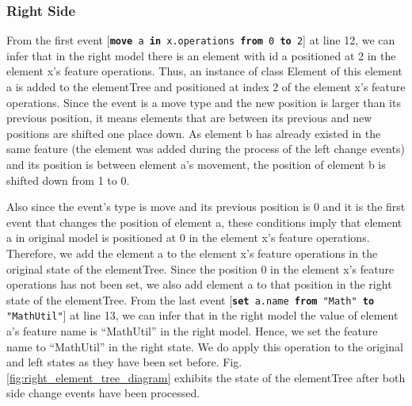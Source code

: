 \documentclass{jot}
\begin{document}
\subsubsection{Right Side}\label{sec:right_side}  From the first event [\texttt{\small \textbf{move} a \textbf{in} x.operations \textbf{from} 0 \textbf{to} 2}] at line 12, we can infer that in the right model there is an element with id \textsf{a} positioned at 2 in the element \textsf{x}'s feature \textsf{operations}. Thus, an instance of class \textsf{Element} of this element \textsf{a} is added to the \textsf{elementTree} and positioned at index 2 of the element \textsf{x}'s feature \textsf{operations}. Since the event is a \textsf{move} type and the new position is larger than its previous position, it means elements that are between its previous and new positions are shifted one place down. As element \textsf{b} has already existed in the same feature (the element was added during the process of the left change events) and its position is between element \textsf{a}'s movement, the position of element \textsf{b} is shifted down from 1 to 0. 

Also since the event's type is \textsf{move} and its previous position is 0 and it is the first event that changes the position of element \textsf{a}, these conditions imply that element \textsf{a} in original model is positioned at 0 in the element \textsf{x}'s feature \textsf{operations}. Therefore, we add the element \textsf{a} to  the element \textsf{x}'s feature \textsf{operations} in the original state of the \textsf{elementTree}. Since the position 0 in the element \textsf{x}'s feature \textsf{operations} has not been set, we also add element \textsf{a} to that position in the right state of the \textsf{elementTree}. From the last event [\texttt{\small \textbf{set} a.name \textbf{from} "Math" \textbf{to} "MathUtil"}] at line 13, we can infer that in the right model the value of element \textsf{a}'s feature \textsf{name} is ``MathUtil'' in the right model. Hence, we set the feature \textsf{name} to ``MathUtil'' in the right state. We do apply this operation to the original and left states as they have been set before. Fig. \ref{fig:right_element_tree_diagram} exhibits the state of the \textsf{elementTree} after both side change events have been processed.
\end{document}
